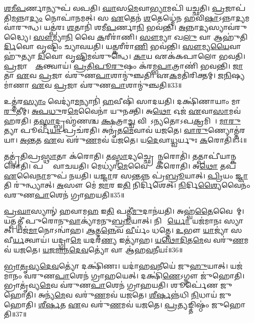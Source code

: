 \ul{𑌶}\ul{𑌮𑍀}\ul{𑌪}𑌰𑍍𑌣𑌾𑌨𑍍𑌯𑍁𑌪॑ 𑌵𑌪𑌤𑌿।
\ul{𑌘𑌾}𑌸\ul{𑌮𑍇}𑌵𑌾\ul{𑌭𑍍𑌯𑌾}𑌮𑌪𑌿॑ 𑌯𑌚𑍍𑌛𑌤𑌿।
\ul{𑌪𑍍𑌰}𑌜𑌾𑌪॑𑌤𑌿\ul{𑌮}𑌨𑍍𑌨𑌾\ul{𑌦𑍍𑌯𑌂} 𑌨𑍋𑌪𑌾॑𑌨𑌮𑌤𑍍।
𑌸 \ul{𑌏}𑌤𑍇𑌨॑ \ul{𑌶}𑌤𑍇𑌧𑍍𑌮𑍇॑𑌨 \ul{𑌹}𑌵𑌿\ul{𑌷𑌾}\-𑌽𑌨𑍍𑌨𑌾\ul{𑌦𑍍𑌯}𑌮𑌵𑌾॑𑌰𑍁𑌨𑍍𑌧।
𑌯𑌤𑍍𑌪॑𑌰𑌃 \ul{𑌶}𑌤𑌾𑌨𑌿॑ 𑌶𑌮𑍀\ul{𑌪}𑌰𑍍𑌣𑌾\ul{𑌨𑌿} 𑌭𑌵॑𑌨𑍍𑌤𑌿।
\ul{𑌅}𑌨𑍍𑌨𑌾\ul{𑌦𑍍𑌯}𑌸𑍍𑌯𑌾𑌵॑𑌰𑍁𑌦𑍍𑌧𑍍𑌯𑍈।
\ul{𑌸𑍗}𑌮𑍍𑌯𑌾\ul{𑌨𑌿} 𑌵𑍈 \ul{𑌕}𑌰𑍀𑌰𑌾॑𑌣𑌿।
\ul{𑌸𑍗}𑌮𑍍𑌯𑌾 𑌖\ul{𑌲𑍁} 𑌵𑌾 𑌆𑌹𑍁॑𑌤𑌿\ul{𑌰𑍍𑌦𑌿}𑌵𑍋 𑌵𑍃𑌷𑍍𑌟𑌿𑌂॑ 𑌚𑍍𑌯𑌾𑌵𑌯𑌤𑌿।
𑌯\ul{𑌤𑍍𑌕}𑌰𑍀𑌰𑌾॑\ul{𑌣𑌿} 𑌭𑌵॑𑌨𑍍𑌤𑌿।
\ul{𑌸𑍗}𑌮𑍍𑌯\ul{𑌯𑍈}𑌵𑌾𑌹𑍁॑𑌤𑍍𑌯𑌾 \ul{𑌦𑌿}𑌵𑍋 𑌵𑍃\ul{𑌷𑍍𑌟𑌿}𑌮𑌵॑𑌰𑍁𑌨𑍍𑌧𑍇।
\ul{𑌕𑌾}𑌯 𑌏𑌕॑𑌕𑌪𑌾𑌲𑍋 𑌭𑌵𑌤𑌿।
\ul{𑌪𑍍𑌰}𑌜𑌾𑌨𑌾𑌂᳚ \ul{𑌕}𑌨𑍍𑌤𑍍𑌵𑌾𑌯॑।
\ul{𑌪𑍍𑌰}\ul{𑌤𑌿}\ul{𑌪𑍂}\ul{𑌰𑍁}𑌷𑌂 𑌕॑𑌰𑌮𑍍𑌭\ul{𑌪𑌾}𑌤𑍍𑌰𑌾𑌣𑌿॑ 𑌭𑌵𑌨𑍍𑌤𑌿।
\ul{𑌜𑌾}𑌤𑌾 \ul{𑌏}𑌵 \ul{𑌪𑍍𑌰}𑌜𑌾 𑌵॑𑌰𑍁𑌣\ul{𑌪𑌾}𑌶𑌾𑌨𑍍𑌮𑍁॑𑌞𑍍𑌚𑌤𑌿।
𑌏\ul{𑌕}𑌮𑌤𑌿॑𑌰𑌿𑌕𑍍𑌤𑌮𑍍।
\ul{𑌜}\ul{𑌨𑌿}𑌷𑍍𑌯𑌮𑌾॑𑌣𑌾 \ul{𑌏}𑌵 \ul{𑌪𑍍𑌰}𑌜𑌾 𑌵॑𑌰𑍁𑌣\ul{𑌪𑌾}𑌶𑌾𑌨𑍍𑌮𑍁॑𑌞𑍍𑌚𑌤𑌿॥33॥\anuvakamend[\ul{𑌨𑌿}\ul{𑌰𑍁}𑌪𑍍𑌯𑌨𑍍𑌤𑍇॑ 𑌭𑌵\ul{𑌤𑍋} 𑌭𑌵॑𑌤𑌿 𑌮𑍇\ul{𑌧𑍍𑌯}𑌤𑍍𑌵𑌾𑌯॑ 𑌰𑍁\ul{𑌨𑍍𑌧𑍇} 𑌷𑌟𑍍𑌚॑]

𑌉𑌤𑍍𑌤॑𑌰\ul{𑌸𑍍𑌯𑌾𑌂} 𑌵𑍇𑌦𑍍𑌯𑌾॑\ul{𑌮}𑌨𑍍𑌯𑌾𑌨𑌿॑ \ul{𑌹}𑌵𑍀𑌷𑌿॑ 𑌸𑌾𑌦𑌯𑌤𑌿।
𑌦𑌕𑍍𑌷𑌿॑𑌣𑌾𑌯𑌾𑌂 𑌮𑌾\ul{𑌰𑍁}𑌤𑍀𑌮𑍍।
\ul{𑌅}\ul{𑌪}\ul{𑌧𑍁}𑌰\ul{𑌮𑍇}𑌵𑍈𑌨𑌾॑ 𑌯𑍁𑌨𑌕𑍍𑌤𑌿।
𑌅\ul{𑌥𑍋} 𑌓𑌜॑ \ul{𑌏}𑌵𑌾\ul{𑌸𑌾}𑌮𑌵॑ 𑌹𑌰𑌤𑌿।
𑌤\ul{𑌸𑍍𑌮𑌾}𑌦𑍍𑌬𑍍𑌰𑌹𑍍𑌮॑𑌣𑌶𑍍𑌚 \ul{𑌕𑍍𑌷}𑌤𑍍𑌰𑌾\ul{𑌚𑍍𑌚} 𑌵𑌿𑌶𑍋᳚\-𑌽𑌨𑍍𑌯𑌤𑍋\-𑌽𑌪\ul{𑌕𑍍𑌰}𑌮𑌿𑌣𑍀𑌃᳚।
\ul{𑌮𑌾}\ul{𑌰𑍁}𑌤𑍍𑌯𑌾 𑌪𑍂𑌰𑍍𑌵॑\ul{𑌯𑌾} 𑌪𑍍𑌰𑌚॑𑌰𑌤𑌿।
𑌅𑌨𑍃॑𑌤\ul{𑌮𑍇}𑌵𑌾𑌵॑ 𑌯𑌜𑌤𑍇।
\ul{𑌵𑌾}\ul{𑌰𑍁}𑌣𑍍𑌯𑍋𑌤𑍍𑌤॑𑌰𑌯𑌾।
\ul{𑌅}\ul{𑌨𑍍𑌤}𑌤 \ul{𑌏}𑌵 𑌵𑌰𑍁॑\ul{𑌣}𑌮𑌵॑ 𑌯𑌜𑌤𑍇।
𑌯\ul{𑌦𑍇}𑌵𑌾\ul{𑌧𑍍𑌵}𑌰𑍍𑌯𑍁𑌃 \ul{𑌕}𑌰𑍋𑌤𑌿॑॥34॥

𑌤𑌤𑍍𑌪𑍍𑌰॑𑌤𑌿𑌪𑍍𑌰\ul{𑌸𑍍𑌥𑌾}𑌤𑌾 𑌕॑𑌰𑍋𑌤𑌿।
𑌤\ul{𑌸𑍍𑌮𑌾}𑌦𑍍𑌯𑌚𑍍𑌛𑍍𑌰𑍇𑌯𑌾᳚\ul{𑌨𑍍𑌕}𑌰𑍋𑌤𑌿॑।
𑌤𑌤𑍍𑌪𑌾𑌪𑍀॑𑌯𑌾𑌨𑍍𑌕𑌰𑍋𑌤𑌿।
𑌪𑌤𑍍𑌨𑍀𑌂᳚ 𑌵𑌾𑌚𑌯𑌤𑌿।
𑌮𑍇𑌧𑍍𑌯𑌾॑\ul{𑌮𑍇}𑌵𑍈𑌨𑌾𑌂᳚ 𑌕𑌰𑍋𑌤𑌿।
𑌅\ul{𑌥𑍋} 𑌤𑌪॑ \ul{𑌏}𑌵𑍈\ul{𑌨𑌾}𑌮𑍁𑌪॑ 𑌨𑌯𑌤𑌿।
𑌯\ul{𑌜𑍍𑌜𑌾}𑌰 𑌸\ul{𑌨𑍍𑌤}𑌨𑍍𑌨 𑌪𑍍𑌰॑\ul{𑌬𑍍𑌰𑍂}𑌯𑌾𑌤𑍍।
\ul{𑌪𑍍𑌰𑌿}𑌯𑌂 \ul{𑌜𑍍𑌞𑌾}𑌤𑌿 𑌰𑍁॑𑌨𑍍𑌧𑍍𑌯𑌾𑌤𑍍।
\ul{𑌅}𑌸𑍗 𑌮𑍇॑ \ul{𑌜𑌾}𑌰 𑌇\ul{𑌤𑌿} 𑌨𑌿𑌰𑍍𑌦𑌿॑𑌶𑍇𑌤𑍍।
\ul{𑌨𑌿}𑌰𑍍𑌦𑌿\ul{𑌶𑍍𑌯𑍈}𑌵𑍈𑌨𑌂॑ 𑌵𑌰𑍁𑌣\ul{𑌪𑌾}𑌶𑍇𑌨॑ 𑌗𑍍𑌰𑌾𑌹𑌯𑌤𑌿॥35॥

\ul{𑌪𑍍𑌰}\ul{𑌘𑌾}𑌸𑍍𑌯𑌾𑌨𑍍॑ 𑌹𑌵𑌾𑌮\ul{𑌹} 𑌇\ul{𑌤𑌿} 𑌪𑌤𑍍𑌨𑍀॑\ul{𑌮𑍁}𑌦𑌾𑌨॑𑌯𑌤𑌿।
𑌅𑌹𑍍𑌵॑\ul{𑌤𑍈}𑌵𑍈𑌨𑌾᳚𑌮𑍍।
𑌯𑌤𑍍𑌪𑌤𑍍𑌨𑍀॑ 𑌪𑍁𑌰𑍋𑌨𑍁\ul{𑌵𑌾}𑌕𑍍𑌯𑌾॑𑌮𑌨𑍁\ul{𑌬𑍍𑌰𑍂}𑌯𑌾𑌤𑍍।
𑌨𑌿𑌰𑍍𑌵𑍀᳚\ul{𑌰𑍍𑌯𑍋} 𑌯𑌜॑𑌮𑌾𑌨𑌃 𑌸𑍍𑌯𑌾𑌤𑍍।
𑌯𑌜॑\ul{𑌮𑌾}𑌨𑍋\-𑌽𑌨𑍍𑌵𑌾॑𑌹।
\ul{𑌆}𑌤𑍍𑌮\ul{𑌨𑍍𑌨𑍇}𑌵 \ul{𑌵𑍀}𑌰𑍍𑌯𑌂॑ 𑌧𑌤𑍍𑌤𑍇।
\ul{𑌉}𑌭𑍗 \ul{𑌯𑌾}𑌜𑍍𑌯𑌾॑ 𑌸𑌵𑍀\ul{𑌰𑍍𑌯}𑌤𑍍𑌵𑌾𑌯॑।
𑌯𑌦𑍍𑌗𑍍𑌰𑌾\ul{𑌮𑍇} 𑌯𑌦𑌰॑\ul{𑌣𑍍𑌯} 𑌇𑌤𑍍𑌯𑌾॑𑌹।
\ul{𑌯}\ul{𑌥𑍋}\ul{𑌦𑌿}𑌤\ul{𑌮𑍇}𑌵 𑌵𑌰𑍁॑\ul{𑌣}𑌮𑌵॑ 𑌯𑌜𑌤𑍇।
\ul{𑌯}\ul{𑌜}\ul{𑌮𑌾}\ul{𑌨}\ul{𑌦𑍇}\ul{𑌵}𑌤𑍍𑌯𑍋॑ 𑌵𑌾 𑌆॑𑌹\ul{𑌵}𑌨𑍀𑌯𑌃॑॥36॥

\ul{𑌭𑍍𑌰𑌾}\ul{𑌤𑍃}\ul{𑌵𑍍𑌯}\ul{𑌦𑍇}\ul{𑌵}𑌤𑍍𑌯𑍋॑ 𑌦𑌕𑍍𑌷𑌿॑𑌣𑌃।
𑌯𑌦𑌾॑𑌹\ul{𑌵}𑌨𑍀𑌯𑍇॑ 𑌜𑍁\ul{𑌹𑍁}𑌯𑌾𑌤𑍍।
𑌯𑌜॑𑌮𑌾𑌨𑌂 𑌵𑌰𑍁𑌣\ul{𑌪𑌾}𑌶𑍇𑌨॑ 𑌗𑍍𑌰𑌾𑌹𑌯𑍇𑌤𑍍।
𑌦𑌕𑍍𑌷𑌿॑\ul{𑌣𑍇}\-𑌽𑌗𑍍𑌨𑍗 𑌜𑍁॑𑌹𑍋𑌤𑌿।
𑌭𑍍𑌰𑌾𑌤𑍃॑𑌵𑍍𑌯\ul{𑌮𑍇}𑌵 𑌵॑𑌰𑍁𑌣\ul{𑌪𑌾}𑌶𑍇𑌨॑ 𑌗𑍍𑌰𑌾𑌹𑌯𑌤𑌿।
𑌶𑍂𑌰𑍍𑌪𑍇॑𑌣 𑌜𑍁𑌹𑍋𑌤𑌿।
𑌅𑌨𑍍𑌯॑\ul{𑌮𑍇}𑌵 𑌵𑌰𑍁॑\ul{𑌣}𑌮𑌵॑ 𑌯𑌜𑌤𑍇।
\ul{𑌶𑍀}\ul{𑌰𑍍}𑌷𑌨𑍍𑌨॑𑌧𑌿 \ul{𑌨𑌿}𑌧𑌾𑌯॑ 𑌜𑍁𑌹𑍋𑌤𑌿।
\ul{𑌶𑍀}\ul{𑌰𑍍}\mbox{}\ul{𑌷}𑌤 \ul{𑌏}𑌵 𑌵𑌰𑍁॑\ul{𑌣}𑌮𑌵॑ 𑌯𑌜𑌤𑍇।
\ul{𑌪𑍍𑌰}𑌤𑍍𑌯𑌙𑍍𑌤𑌿𑌷𑍍𑌠𑌂॑ 𑌜𑍁𑌹𑍋𑌤𑌿॥37॥

